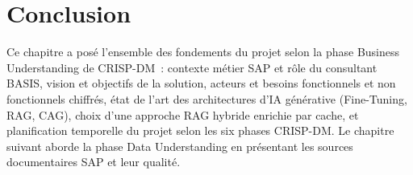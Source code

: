 \section*{Conclusion}

Ce chapitre a posé l'ensemble des fondements du projet selon la phase Business Understanding de CRISP-DM~: contexte métier SAP et rôle du consultant BASIS, vision et objectifs de la solution, acteurs et besoins fonctionnels et non fonctionnels chiffrés, état de l'art des architectures d'IA générative (Fine-Tuning, RAG, CAG), choix d'une approche RAG hybride enrichie par cache, et planification temporelle du projet selon les six phases CRISP-DM. Le chapitre suivant aborde la phase Data Understanding en présentant les sources documentaires SAP et leur qualité.
